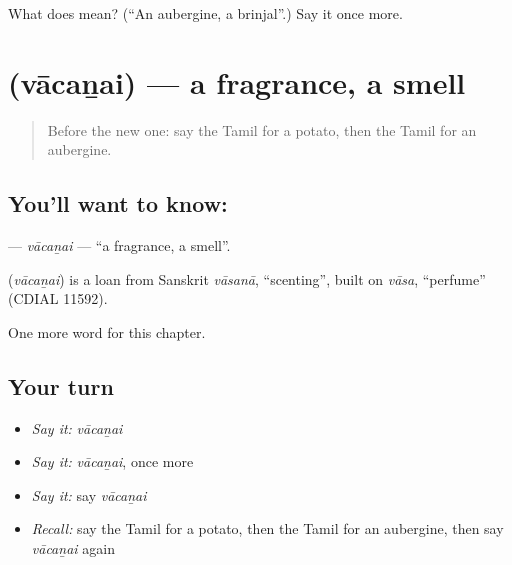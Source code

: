 \begin{tcolorbox}[breakable,colback=teal!4,colframe=teal!35!black,title={Before you move on}]
What does  mean? (\textquotedblleft{}An aubergine, a brinjal\textquotedblright{}.) Say it once more.
\end{tcolorbox}
\section[\texorpdfstring{\ta{வாசனை} (vācaṉai)}{வாசனை (vācaṉai)}]{ (vācaṉai) — a fragrance, a smell}

\label{lesson:TA-C243-vacanai}



\begin{quote}
Before the new one: say the Tamil for a potato, then the Tamil for an aubergine.
\end{quote}

\subsection*{You'll want to know: }
\textbf{} — \emph{vācaṉai} — \textquotedblleft{}a fragrance, a smell\textquotedblright{}.

\begin{cousinweb}
\textbf{} (\emph{vācaṉai}) is a loan from Sanskrit \emph{vāsanā}, \textquotedblleft{}scenting\textquotedblright{}, built on \emph{vāsa}, \textquotedblleft{}perfume\textquotedblright{} (CDIAL 11592).
\end{cousinweb}

\begin{grammarlens}[title={What you've built}]
One more word for this chapter.
\end{grammarlens}

\subsection*{Your turn}
\begin{itemize}
\raggedright
  \item \emph{Say it:} \emph{vācaṉai}
  \item \emph{Say it:} \emph{vācaṉai}, once more
  \item \emph{Say it:} say \emph{vācaṉai}
  \item \emph{Recall:} say the Tamil for a potato, then the Tamil for an aubergine, then say \emph{vācaṉai} again
\end{itemize}

